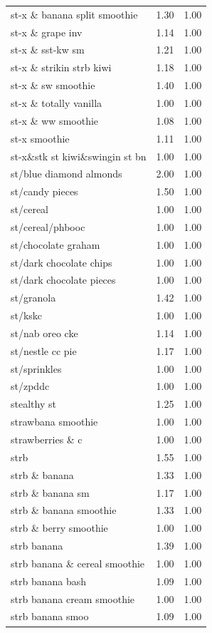 \begin{table}
\begin{tabular}{lrr}
st-x \& banana split smoothie & 1.30 & 1.00 \\
st-x \& grape inv & 1.14 & 1.00 \\
st-x \& sst-kw sm & 1.21 & 1.00 \\
st-x \& strikin strb kiwi & 1.18 & 1.00 \\
st-x \& sw smoothie & 1.40 & 1.00 \\
st-x \& totally vanilla & 1.00 & 1.00 \\
st-x \& ww smoothie & 1.08 & 1.00 \\
st-x smoothie & 1.11 & 1.00 \\
st-x\&stk st kiwi\&swingin st bn & 1.00 & 1.00 \\
st/blue diamond almonds & 2.00 & 1.00 \\
st/candy pieces & 1.50 & 1.00 \\
st/cereal & 1.00 & 1.00 \\
st/cereal/phbooc & 1.00 & 1.00 \\
st/chocolate graham & 1.00 & 1.00 \\
st/dark chocolate chips & 1.00 & 1.00 \\
st/dark chocolate pieces & 1.00 & 1.00 \\
st/granola & 1.42 & 1.00 \\
st/kskc & 1.00 & 1.00 \\
st/nab oreo cke & 1.14 & 1.00 \\
st/nestle cc pie & 1.17 & 1.00 \\
st/sprinkles & 1.00 & 1.00 \\
st/zpddc & 1.00 & 1.00 \\
stealthy st & 1.25 & 1.00 \\
strawbana smoothie & 1.00 & 1.00 \\
strawberries \& c & 1.00 & 1.00 \\
strb & 1.55 & 1.00 \\
strb \& banana & 1.33 & 1.00 \\
strb \& banana sm & 1.17 & 1.00 \\
strb \& banana smoothie & 1.33 & 1.00 \\
strb \& berry smoothie & 1.00 & 1.00 \\
strb banana & 1.39 & 1.00 \\
strb banana \& cereal smoothie & 1.00 & 1.00 \\
strb banana bash & 1.09 & 1.00 \\
strb banana cream smoothie & 1.00 & 1.00 \\
strb banana smoo & 1.09 & 1.00 \\

\end{tabular}
\end{table}
